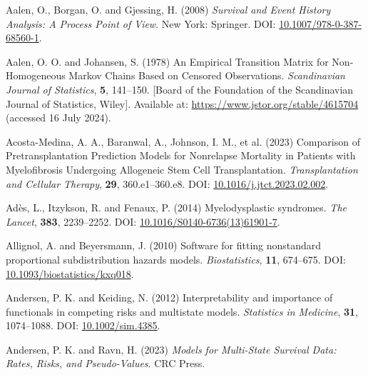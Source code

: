 \documentclass[
  letterpaper,
  paper=240mm:170mm,
  twoside=true,
  open=right,
  fontsize=10pt,
  pagesize=false,
  BCOR=15mm,
  DIV=14,
  headinclude=true,
  footinclude=false,
  headsepline=on]{scrbook}
\newlength{\cslhangindent}
\newenvironment{CSLReferences}[2] %
 {\begin{list}{}{%
  \setlength{\itemindent}{0pt}
  \setlength{\leftmargin}{0pt}
  \setlength{\parsep}{0pt}
  \ifodd #1
   \setlength{\leftmargin}{\cslhangindent}
   \setlength{\itemindent}{-1\cslhangindent}
  \fi
  \setlength{\itemsep}{#2\baselineskip}}}
 {\end{list}}
\begin{document}
\label{refs}
\begin{CSLReferences}{1}{1}
Aalen, O., Borgan, O. and Gjessing, H. (2008) \emph{Survival and Event
History Analysis: A Process Point of View}. New York: Springer. DOI:
\href{https://doi.org/10.1007/978-0-387-68560-1}{10.1007/978-0-387-68560-1}.

Aalen, O. O. and Johansen, S. (1978) An {Empirical Transition Matrix}
for {Non-Homogeneous Markov Chains Based} on {Censored Observations}.
\emph{Scandinavian Journal of Statistics}, \textbf{5}, 141--150.
{[}Board of the Foundation of the Scandinavian Journal of Statistics,
Wiley{]}. Available at: \url{https://www.jstor.org/stable/4615704}
(accessed 16 July 2024).

Acosta-Medina, A. A., Baranwal, A., Johnson, I. M., et al. (2023)
Comparison of {Pretransplantation Prediction Models} for {Nonrelapse
Mortality} in {Patients} with {Myelofibrosis Undergoing Allogeneic Stem
Cell Transplantation}. \emph{Transplantation and Cellular Therapy},
\textbf{29}, 360.e1--360.e8. DOI:
\href{https://doi.org/10.1016/j.jtct.2023.02.002}{10.1016/j.jtct.2023.02.002}.

Adès, L., Itzykson, R. and Fenaux, P. (2014) Myelodysplastic syndromes.
\emph{The Lancet}, \textbf{383}, 2239--2252. DOI:
\href{https://doi.org/10.1016/S0140-6736(13)61901-7}{10.1016/S0140-6736(13)61901-7}.

Allignol, A. and Beyersmann, J. (2010) Software for fitting nonstandard
proportional subdistribution hazards models. \emph{Biostatistics},
\textbf{11}, 674--675. DOI:
\href{https://doi.org/10.1093/biostatistics/kxq018}{10.1093/biostatistics/kxq018}.

Andersen, P. K. and Keiding, N. (2012) Interpretability and importance
of functionals in competing risks and multistate models.
\emph{Statistics in Medicine}, \textbf{31}, 1074--1088. DOI:
\href{https://doi.org/10.1002/sim.4385}{10.1002/sim.4385}.

Andersen, P. K. and Ravn, H. (2023) \emph{Models for {Multi-State
Survival Data}: {Rates}, {Risks}, and {Pseudo-Values}}. CRC Press.


\end{CSLReferences}
\end{document}
